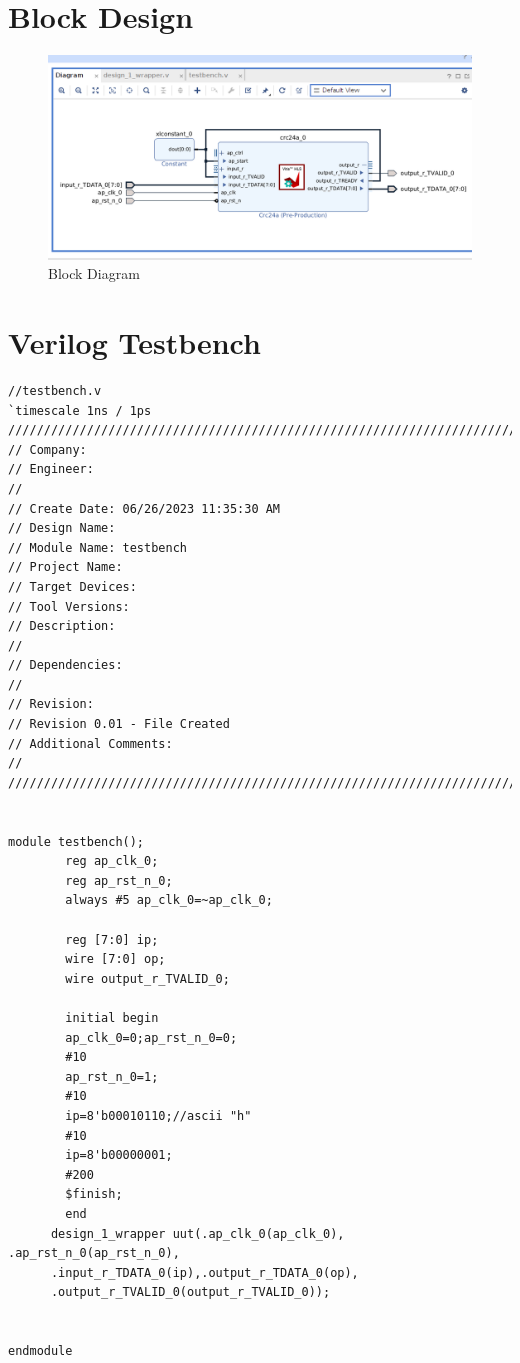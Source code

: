 \documentclass{article}
\begin{document}
\section{Block Design}
\vspace{1cm}
\begin{figure}[h]
    \centering
\includegraphics[width=\columnwidth]{figs/p1bd.png}
    \caption{Block Diagram}
    \label{fig:my_label}
\end{figure}
\vspace{3cm}
\section{Verilog Testbench}
\begin{lstlisting}
//testbench.v
`timescale 1ns / 1ps
//////////////////////////////////////////////////////////////////////////////////
// Company: 
// Engineer: 
// 
// Create Date: 06/26/2023 11:35:30 AM
// Design Name: 
// Module Name: testbench
// Project Name: 
// Target Devices: 
// Tool Versions: 
// Description: 
// 
// Dependencies: 
// 
// Revision:
// Revision 0.01 - File Created
// Additional Comments:
// 
//////////////////////////////////////////////////////////////////////////////////


module testbench();
        reg ap_clk_0;
        reg ap_rst_n_0;
        always #5 ap_clk_0=~ap_clk_0;
        
        reg [7:0] ip;
        wire [7:0] op;
        wire output_r_TVALID_0;
       
        initial begin
        ap_clk_0=0;ap_rst_n_0=0;
        #10
        ap_rst_n_0=1;
        #10
        ip=8'b00010110;//ascii "h"
        #10
        ip=8'b00000001;
        #200
        $finish;
        end
      design_1_wrapper uut(.ap_clk_0(ap_clk_0), .ap_rst_n_0(ap_rst_n_0),
      .input_r_TDATA_0(ip),.output_r_TDATA_0(op),
      .output_r_TVALID_0(output_r_TVALID_0));
    
    
endmodule

\end{lstlisting}
\end{document}
